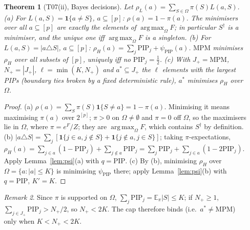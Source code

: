 \documentclass[11pt]{article}
\newtheorem{theorem}{Theorem}[section]
\theoremstyle{remark}
\newtheorem{remark}[theorem]{Remark}
\newcommand{\one}{\mathbf 1}
\newcommand{\PIP}{\mathrm{PIP}}
\newcommand{\MPM}{\mathrm{MPM}}
\DeclareMathOperator*{\argmax}{arg\,max}
\begin{document}
\begin{theorem}[T07(ii), Bayes decisions]\label{thm:bayes}
Let $\rho_L(a)=\sum_{S\in\Omega}\pi(S)L(a,S)$.
(a) For $L(a,S)=\one\{a\ne S\}$, $a\subseteq[p]$: $\rho(a)=1-\pi(a)$. The minimisers over all $a\subseteq[p]$ are exactly the elements of $\argmax_\Omega F$; in particular $S^\dagger$ is a minimiser, and the unique one iff $\argmax_\Omega F$ is a singleton.
(b) For $L(a,S)=|a\triangle S|$, $a\subseteq[p]$: $\rho_H(a)=\sum_j\PIP_j+\psi_{\PIP}(a)$. $\MPM$ minimises $\rho_H$ over all subsets of $[p]$, uniquely iff no $\PIP_j=\tfrac12$.
(c) With $J_+=\MPM$, $N_+=|J_+|$, $\ell=\min(K,N_+)$ and $a^*\subseteq J_+$ the $\ell$ elements with the largest PIPs (boundary ties broken by a fixed deterministic rule), $a^*$ minimises $\rho_H$ over $\Omega$.
\end{theorem}
\begin{proof}
(a) $\rho(a)=\sum_S\pi(S)\one\{S\ne a\}=1-\pi(a)$. Minimising it means maximising $\pi(a)$ over $2^{[p]}$; $\pi>0$ on $\Omega\ne\emptyset$ and $\pi=0$ off $\Omega$, so the maximisers lie in $\Omega$, where $\pi=e^F/Z$; they are $\argmax_\Omega F$, which contains $S^\dagger$ by definition.
(b) $|a\triangle S|=\sum_j[\one\{j\in a,j\notin S\}+\one\{j\notin a,j\in S\}]$; taking $\pi$-expectations, $\rho_H(a)=\sum_{j\in a}(1-\PIP_j)+\sum_{j\notin a}\PIP_j=\sum_j\PIP_j+\sum_{j\in a}(1-2\PIP_j)$. Apply Lemma~\ref{lem:psi}(a) with $q=\PIP$.
(c) By (b), minimising $\rho_H$ over $\Omega=\{a:|a|\le K\}$ is minimising $\psi_{\PIP}$ there; apply Lemma~\ref{lem:psi}(b) with $q=\PIP$, $K'=K$.
\end{proof}

\begin{remark}
Since $\pi$ is supported on $\Omega$, $\sum_j\PIP_j=\mathbb E_\pi|S|\le K$; if $N_+\ge1$, $\sum_{j\in J_+}\PIP_j>N_+/2$, so $N_+<2K$. The cap therefore binds (i.e.\ $a^*\ne\MPM$) only when $K<N_+<2K$.
\end{remark}
\end{document}
